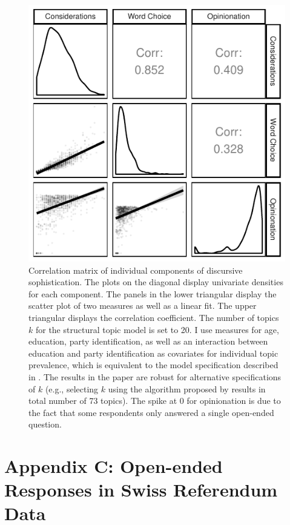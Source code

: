 \documentclass[12pt]{article}
\begin{document}
\begin{figure}[h]\centering
\includegraphics{../fig/yg_corplot_components.pdf}
\caption{Correlation matrix of individual components of discursive sophistication. The plots on the diagonal display univariate densities for each component. The panels in the lower triangular display the scatter plot of two measures as well as a linear fit. The upper triangular displays the correlation coefficient. The number of topics $k$ for the structural topic model is set to 20. I use measures for age, education, party identification, as well as an interaction between education and party identification as covariates for individual topic prevalence, which is equivalent to the model specification described in \citet{roberts2014structural}. The results in the paper are robust for alternative specifications of $k$ (e.g., selecting $k$ using the algorithm proposed by \citet{lee2014low} results in total number of 73 topics). The spike at 0 for opinionation is due to the fact that some respondents only answered a single open-ended question.}\label{fig:yg_components}
\end{figure}



\clearpage
\section*{Appendix C: Open-ended Responses in Swiss Referendum Data}
\renewcommand\thefigure{C.\arabic{figure}}
\renewcommand\thetable{C.\arabic{table}}
\setcounter{figure}{0}
\setcounter{table}{0}
\end{document}
